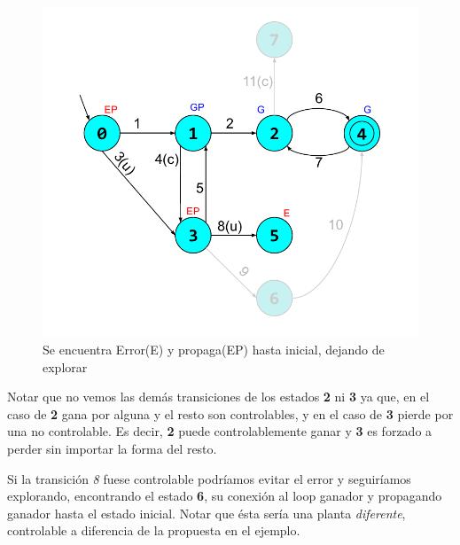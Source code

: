 \begin{figure}
 \centering
 \includegraphics[scale=0.6]{figures/ejemplo_on-the-fly/4.pdf}
 \caption{Se encuentra Error(E) y propaga(EP) hasta inicial, dejando de explorar}
 \label{fig:ej:exploracion4}
\end{figure}

Notar que no vemos las demás transiciones de los estados \textbf{2} ni \textbf{3} ya que, en el caso de \textbf{2} gana por alguna y el resto son controlables, y en el caso de \textbf{3} pierde por una no controlable. Es decir, \textbf{2} puede controlablemente ganar y \textbf{3} es forzado a perder sin importar la forma del resto.

Si la transición \textit{8} fuese controlable podríamos evitar el error y seguiríamos explorando, encontrando el estado \textbf{6}, su conexión al loop ganador y propagando ganador hasta el estado inicial. Notar que ésta sería una planta \textit{diferente}, controlable a diferencia de la propuesta en el ejemplo.














